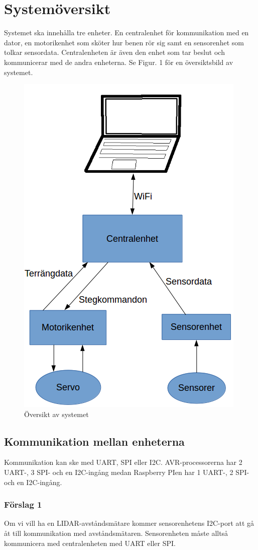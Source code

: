 \documentclass[a4paper,titlepage,12pt]{article}
\begin{document}
	\section{Systemöversikt}
	Systemet ska innehålla tre enheter. En centralenhet för kommunikation med en
    dator, en motorikenhet som sköter hur benen rör sig samt en sensorenhet som
    tolkar sensordata. Centralenheten är även den enhet som tar beslut och
    kommunicerar med de andra enheterna. Se Figur. 1 för en översiktsbild av
    systemet.
	\begin{figure}[h]
		\centering
		\includegraphics[width=0.5\linewidth]{../images/overview.png}
		\caption{Översikt av systemet\label{fig:overview}}
	\end{figure}

	\subsection{Kommunikation mellan enheterna}
	Kommunikation kan ske med UART, SPI eller I2C. AVR-processorerna har
	2 UART-, 3 SPI- och en I2C-ingång medan Raspberry PIen har 1 UART-, 2 SPI- och
	en I2C-ingång. 

	\subsubsection{Förslag 1}
	Om vi vill ha en LIDAR-avståndsmätare kommer sensorenhetens I2C-port att gå åt
	till kommunikation med avståndsmätaren. Sensorenheten måste alltså kommunicera med
	centralenheten med UART eller SPI.

	
\end{document}
